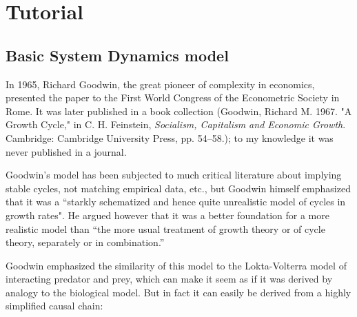 \chapter{Tutorial}\label{tutorial}

\section{Basic System Dynamics model}

In 1965, Richard Goodwin, the great pioneer of complexity in
economics, presented the paper  to
the First World Congress of the Econometric Society in Rome. It was
later published in a book collection (Goodwin, Richard M. 1967. "A
Growth Cycle," in C. H. Feinstein, {\em Socialism, Capitalism and Economic
Growth}. Cambridge: Cambridge University Press, pp. 54--58.); to my
knowledge it was never published in a journal. 

Goodwin's model has been subjected to much critical literature about
implying stable cycles, not matching empirical data, etc., but Goodwin
himself emphasized that it was a ``starkly schematized and hence quite
unrealistic model of cycles in growth rates". He argued however that
it was a better foundation for a more realistic model than ``the more
usual treatment of growth theory or of cycle theory, separately or in
combination.'' 

Goodwin emphasized the similarity of this model to the Lokta-Volterra
model of interacting predator and prey, which can make it seem as if
it was derived by analogy to the biological model. But in fact it can
easily be derived from a highly simplified causal chain:

